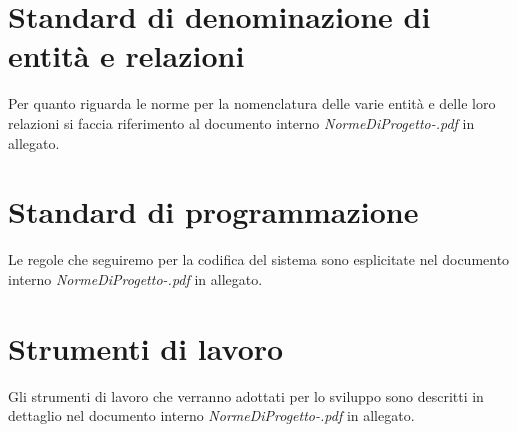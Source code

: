 \section{Standard di denominazione di entit\`a e relazioni}
Per quanto riguarda le norme per la nomenclatura delle varie entit\`a e delle
loro relazioni si faccia riferimento al documento interno
\emph{NormeDiProgetto-\versionenormeprogetto.pdf} in allegato.

\section{Standard di programmazione}
Le regole che seguiremo per la codifica del sistema sono esplicitate nel
documento interno \emph{NormeDiProgetto-\versionenormeprogetto.pdf} in allegato.

\section{Strumenti di lavoro}
Gli strumenti di lavoro che verranno adottati per lo sviluppo sono descritti in
dettaglio nel documento interno \emph{NormeDiProgetto-\versionenormeprogetto.pdf} in
allegato.


